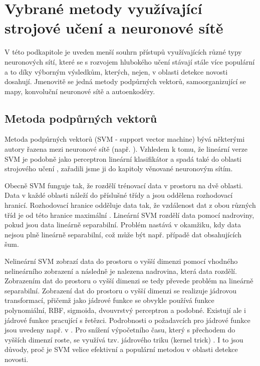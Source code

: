 \section{Vybrané metody využívající strojové učení a neuronové sítě}
V této podkapitole je uveden menší souhrn přístupů  využívajících různé typy neuronových sítí, které se s rozvojem hlubokého učení stávají stále více populární a to díky výborným výsledkům, kterých, nejen, v oblasti detekce novosti dosahují. Jmenovitě se jedná metody podpůrných vektorů, samoorganizující se mapy, konvoluční neuronové sítě a autoenkodéry.
\subsection{Metoda podpůrných vektorů}
Metoda podpůrných vektorů (SVM - support vector machine) bývá některými autory řazena mezi neuronové sítě (např. \cite{markou2}). Vzhledem k tomu, že lineární verze SVM \cite{svm1} je podobně jako perceptron \cite{perceptron} lineární klasifikátor a spadá také do oblasti strojového učení \cite{ml1,ml2}, zařadili jsme ji do kapitoly věnované neuronovým sítím.
\par 
Obecně SVM funguje tak, že rozdělí trénovací data v prostoru na dvě oblasti. Data v každé oblasti náleží do příslušné třídy a jsou oddělena rozhodovací hranicí. Rozhodovací hranice odděluje data tak, že vzdálenost dat z obou různých tříd je od této hranice maximální \cite{svm3}. Lineární SVM rozdělí data pomocí nadroviny, pokud jsou data lineárně separabilní. Problém nastává v okamžiku, kdy data nejsou plně lineárně separabilní, což může být např.  případě dat obsahujících šum.
\par 
Nelineární SVM \cite{svm1} zobrazí data do prostoru o vyšší dimenzi pomocí vhodného nelineárního zobrazení a následně je nalezena nadrovina, která data rozdělí. Zobrazením dat do prostoru o vyšší dimenzi se tedy převede problém na lineárně separabilní. Zobrazení dat do prostoru o vyšší dimenzi se realizuje jádrovou transformací, přičemž jako jádrové funkce se obvykle používá funkce polynomiální, RBF, sigmoida, dvouvrstvý perceptron a podobné. Existují ale i jádrové funkce pracující s řetězci. Podrobnosti o požadavcích pro jádrové funkce jsou uvedeny např. v \cite{svm4}. Pro snížení výpočetního času, který s přechodem do vyšších dimenzí roste, se využívá tzv. jádrového triku (kernel trick) \cite{kernel}. I to jsou důvody, proč je SVM velice efektivní a populární metodou v oblasti detekce novosti.
\par 
